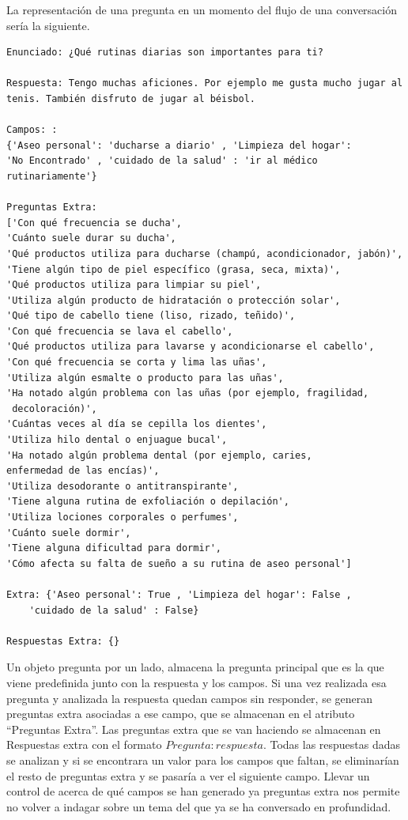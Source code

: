 La representación de una pregunta en un momento del flujo de una conversación sería la siguiente. 
\begin{verbatim}
Enunciado: ¿Qué rutinas diarias son importantes para ti? 

Respuesta: Tengo muchas aficiones. Por ejemplo me gusta mucho jugar al
tenis. También disfruto de jugar al béisbol.

Campos: :
{'Aseo personal': 'ducharse a diario' , 'Limpieza del hogar':
'No Encontrado' , 'cuidado de la salud' : 'ir al médico rutinariamente'}

Preguntas Extra:
['Con qué frecuencia se ducha',
'Cuánto suele durar su ducha',
'Qué productos utiliza para ducharse (champú, acondicionador, jabón)',
'Tiene algún tipo de piel específico (grasa, seca, mixta)',
'Qué productos utiliza para limpiar su piel',
'Utiliza algún producto de hidratación o protección solar',
'Qué tipo de cabello tiene (liso, rizado, teñido)',
'Con qué frecuencia se lava el cabello',
'Qué productos utiliza para lavarse y acondicionarse el cabello',
'Con qué frecuencia se corta y lima las uñas',
'Utiliza algún esmalte o producto para las uñas',
'Ha notado algún problema con las uñas (por ejemplo, fragilidad,
 decoloración)',
'Cuántas veces al día se cepilla los dientes',
'Utiliza hilo dental o enjuague bucal',
'Ha notado algún problema dental (por ejemplo, caries, 
enfermedad de las encías)',
'Utiliza desodorante o antitranspirante',
'Tiene alguna rutina de exfoliación o depilación',
'Utiliza lociones corporales o perfumes',
'Cuánto suele dormir',
'Tiene alguna dificultad para dormir',
'Cómo afecta su falta de sueño a su rutina de aseo personal']

Extra: {'Aseo personal': True , 'Limpieza del hogar': False , 
	'cuidado de la salud' : False}

Respuestas Extra: {}
\end{verbatim}

Un objeto pregunta por un lado, almacena la pregunta principal que es la que viene predefinida junto con la respuesta y los campos. Si una vez realizada esa pregunta y analizada la respuesta quedan campos sin responder, se generan preguntas extra asociadas a ese campo, que se almacenan en el atributo ``Preguntas Extra''. Las preguntas extra que se van haciendo se almacenan en Respuestas extra con el formato ${Pregunta:respuesta}$. Todas las respuestas dadas se analizan y si se encontrara un valor para los campos que faltan, se eliminarían el resto de preguntas extra y se pasaría a ver el siguiente campo. Llevar un control de acerca de qué campos se han generado ya preguntas extra nos permite no volver a indagar sobre un tema del que ya se ha conversado en profundidad. 

